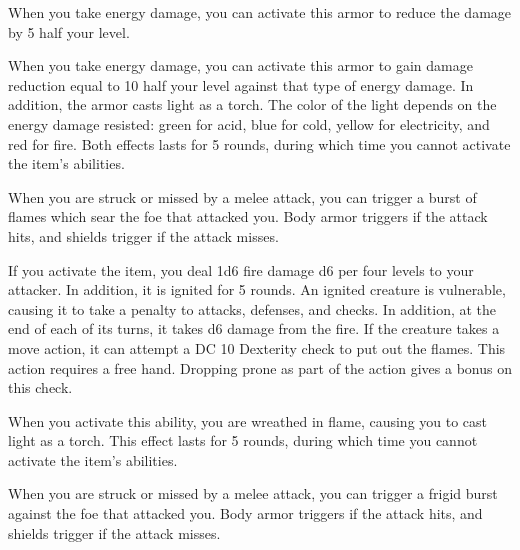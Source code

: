 
 When you take energy damage, you can activate this armor to reduce the damage by 5 \add half your level.


 When you take energy damage, you can activate this armor to gain damage reduction equal to 10 \add half your level against that type of energy damage.
In addition, the armor casts light as a torch.
The color of the light depends on the energy damage resisted: green for acid, blue for cold, yellow for electricity, and red for fire.
Both effects lasts for 5 rounds, during which time you cannot activate the item's abilities.


 When you are struck or missed by a melee attack, you can trigger a burst of flames which sear the foe that attacked you.
Body armor triggers if the attack hits, and shields trigger if the attack misses.

If you activate the item, you deal 1d6 fire damage \add d6 per four levels to your attacker.
In addition, it is ignited for 5 rounds.
An ignited creature is vulnerable, causing it to take a  penalty to attacks, defenses, and checks.
In addition, at the end of each of its turns, it takes d6 damage from the fire.
If the creature takes a move action, it can attempt a DC 10 Dexterity check to put out the flames.
This action requires a free hand.
Dropping prone as part of the action gives a  bonus on this check.

When you activate this ability, you are wreathed in flame, causing you to cast light as a torch.
This effect lasts for 5 rounds, during which time you cannot activate the item's abilities.


 When you are struck or missed by a melee attack, you can trigger a frigid burst against the foe that attacked you.
Body armor triggers if the attack hits, and shields trigger if the attack misses.

